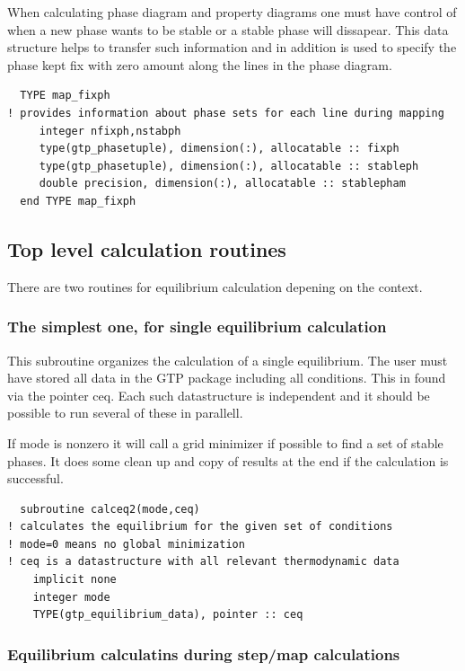 \documentclass[12pt]{article}
\begin{document}
When calculating phase diagram and property diagrams one must have
control of when a new phase wants to be stable or a stable phase will
dissapear.  This data structure helps to transfer such information and
in addition is used to specify the phase kept fix with zero amount
along the lines in the phase diagram.

{\small
\begin{verbatim}
  TYPE map_fixph
! provides information about phase sets for each line during mapping
     integer nfixph,nstabph
     type(gtp_phasetuple), dimension(:), allocatable :: fixph
     type(gtp_phasetuple), dimension(:), allocatable :: stableph
     double precision, dimension(:), allocatable :: stablepham
  end TYPE map_fixph
\end{verbatim}
}

\subsection{Top level calculation routines}

There are two routines for equilibrium calculation depening on the
context.

\subsubsection{The simplest one, for single equilibrium calculation}

This subroutine organizes the calculation of a single equilibrium.
The user must have stored all data in the GTP package including all
conditions.  This in found via the pointer ceq.  Each such
datastructure is independent and it should be possible to run several
of these in parallell.

If mode is nonzero it will call a grid minimizer if possible to find a
set of stable phases.  It does some clean up and copy of results at
the end if the calculation is successful.

{\small
\begin{verbatim}
  subroutine calceq2(mode,ceq)
! calculates the equilibrium for the given set of conditions
! mode=0 means no global minimization
! ceq is a datastructure with all relevant thermodynamic data
    implicit none
    integer mode
    TYPE(gtp_equilibrium_data), pointer :: ceq
\end{verbatim}
}

\subsubsection{Equilibrium calculatins during step/map calculations}
\end{document}
